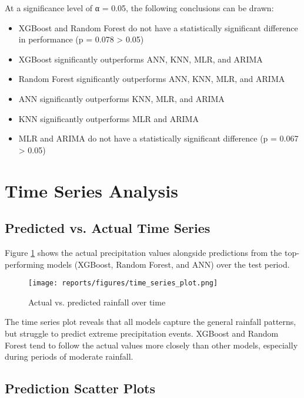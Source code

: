 \documentclass[12pt]{article}
\begin{document}
At a significance level of α = 0.05, the following conclusions can be drawn:
\begin{itemize}
    \item XGBoost and Random Forest do not have a statistically significant difference in performance (p = 0.078 > 0.05)
    \item XGBoost significantly outperforms ANN, KNN, MLR, and ARIMA
    \item Random Forest significantly outperforms ANN, KNN, MLR, and ARIMA
    \item ANN significantly outperforms KNN, MLR, and ARIMA
    \item KNN significantly outperforms MLR and ARIMA
    \item MLR and ARIMA do not have a statistically significant difference (p = 0.067 > 0.05)
\end{itemize}

\section{Time Series Analysis}
\label{sec:time_series_analysis}

\subsection{Predicted vs. Actual Time Series}
\label{subsec:time_series_comparison}

Figure \ref{fig:time_series_plot} shows the actual precipitation values alongside predictions from the top-performing models (XGBoost, Random Forest, and ANN) over the test period.

\begin{figure}[h]
\centering
\texttt{[image: reports/figures/time\_series\_plot.png]}
\caption{Actual vs. predicted rainfall over time}
\label{fig:time_series_plot}
\end{figure}

The time series plot reveals that all models capture the general rainfall patterns, but struggle to predict extreme precipitation events. XGBoost and Random Forest tend to follow the actual values more closely than other models, especially during periods of moderate rainfall.

\subsection{Prediction Scatter Plots}
\label{subsec:prediction_scatter}
\end{document}
